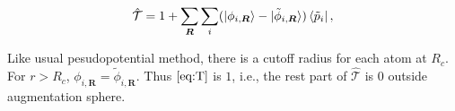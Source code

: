\begin{equation}\label{eq:T}
	\hat{\mathcal{T}} = 1 + \sum_{\bm{R}} \sum_{i}
	(\ket{\phi_{i, \bm{R}}} - \ket{\tilde{\phi}_{i, \bm{R}}}) \bra{\tilde{p}_i},
\end{equation}


Like usual pesudopotential method, there is a cutoff radius for each atom at $R_c$. For $r > R_c$, $\phi_{i, \bm{R}} = \tilde{\phi}_{i, \bm{R}}$. Thus $\eqref{eq:T}$ is
$1$, i.e., the rest part of $\hat{\mathcal{T}}$ is $0$ outside augmentation sphere.
